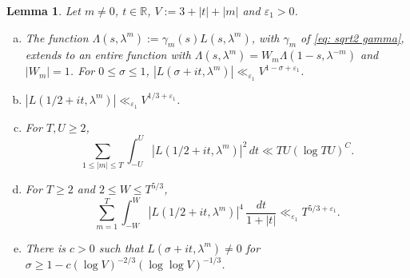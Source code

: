 \documentclass{article}
\numberwithin{equation}{section}
\newtheorem{lemma}{Lemma}
\newcommand{\Le}{\leqslant}
\newcommand{\Ge}{\geqslant}
\begin{document}
\begin{lemma}
\label{lem: sqrt2 L}
Let $m \neq 0$, $t \in \mathbb{R}$, $V := 3 + |t| + |m|$ and $\varepsilon_1 > 0$.
\begin{enumerate}[(a)]
\item The function $\Lambda(s, \lambda^m) := \gamma_m(s) L(s, \lambda^m)$, with $\gamma_m$ of \eqref{eq: sqrt2 gamma}, extends to an entire function with $\Lambda(s, \lambda^m) = W_m \Lambda(1 - s, \lambda^{-m})$ and $|W_m| = 1$. For $0 \Le \sigma \Le 1$, $|L(\sigma + it, \lambda^m)| \ll_{\varepsilon_1} V^{1 - \sigma + \varepsilon_1}$.
\item $|L(1/2 + it, \lambda^m)| \ll_{\varepsilon_1} V^{1/3 + \varepsilon_1}$.
\item For $T, U \Ge 2$,
\begin{equation*}
\sum_{1 \Le |m| \Le T} \int_{-U}^{U} |L(1/2 + it, \lambda^m)|^2\, dt \ll TU (\log TU)^{C}.
\end{equation*}
\item For $T \Ge 2$ and $2 \Le W \Le T^{5/3}$,
\begin{equation*}
\sum_{m = 1}^{T} \int_{-W}^{W} |L(1/2 + it, \lambda^m)|^4\, \frac{dt}{1 + |t|} \ll_{\varepsilon_1} T^{5/3 + \varepsilon_1}.
\end{equation*}
\item There is $c > 0$ such that $L(\sigma + it, \lambda^m) \neq 0$ for $\sigma \Ge 1 - c (\log V)^{-2/3} (\log\log V)^{-1/3}$.
\end{enumerate}
\end{lemma}
\end{document}

